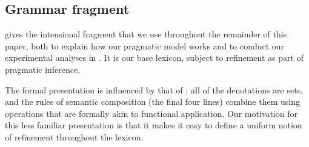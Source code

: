 \documentclass[leqno,12pt]{article}
\begin{document}

\subsection{Grammar fragment}\label{sec:grammar}

 gives the intensional fragment that we use
throughout the remainder of this paper, both to explain how our
pragmatic model works and to conduct our experimental analyses in
. It is our base lexicon, subject to refinement as
part of pragmatic inference.

The formal presentation is influenced by that of \citet{Muskens95}:
all of the denotations are sets, and the rules of semantic composition
(the final four lines) combine them using operations that are formally
akin to functional application. Our motivation for this less familiar
presentation is that it makes it easy to define a uniform notion of
refinement throughout the lexicon.
\end{document}
